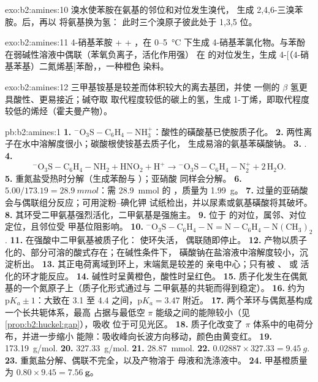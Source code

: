 \begin{solution}{exo:b2:amines:10}
溴水使苯胺在氨基的邻位和对位发生溴代，
生成 2,4,6-三溴苯胺。后，再以  将氨基换为氢：
此时三个溴原子彼此处于 1,3,5 位。
\end{solution}

\begin{solution}{exo:b2:amines:11}
4-硝基苯胺 +  + ，在 0--\qty{5}{\degreeCelsius} 下生成
4-硝基苯氯化物。与苯酚在弱碱性溶液中偶联（苯氧负离子，活化作用强）
在  的对位发生，生成 4-[（4-硝基苯基）二氮烯基]苯酚，，一种橙色
染料。
\end{solution}

\begin{solution}{exo:b2:amines:12}
三甲基铵基是较差而体积较大的离去基团，并使
 一侧的 $\beta$ 氢更具酸性、更易接近；碱夺取
取代程度较低的碳上的氢，生成 1-丁烯，即取代程度较低的烯烃（霍夫曼产物）。
\end{solution}

\begin{solution}{pb:b2:amines:1}
\textbf{1.} $\mathrm{{}^-O_3S{-}C_6H_4{-}NH_3^+}$：酸性的磺酸基已使胺质子化。
\textbf{2.} 两性离子在水中溶解度很小；碳酸根使铵基去质子化，
生成易溶的氨基苯磺酸钠。
\textbf{3.} .
\textbf{4.}
\[
  \mathrm{{}^-O_3S{-}C_6H_4{-}NH_2 + HNO_2 + H^+ \to {}^-O_3S{-}C_6H_4{-}N_2^+ + 2\,H_2O} .
\]
\textbf{5.} 重氮盐受热时分解（生成苯酚与 ）；亚硝酸
同样会分解。
\textbf{6.} $5.00/173.19 = \qty{28.9}{mmol}$：需 \qty{28.9}{mmol} 的 ，质量为 \qty{1.99}{g}。
\textbf{7.} 过量的亚硝酸会与偶联组分反应；可用淀粉–碘化钾
试纸检出，并以尿素或氨基磺酸将其破坏。
\textbf{8.} 其环受二甲氨基强烈活化，二甲氨基是强施主。
\textbf{9.} 位于  的对位，属邻、对位定位，且邻位受
甲基位阻影响。
\textbf{10.} $\mathrm{{}^-O_3S{-}C_6H_4{-}N{=}N{-}C_6H_4{-}N(CH_3)_2}$.
\textbf{11.} 在强酸中二甲氨基被质子化： 使环失活，
偶联随即停止。
\textbf{12.} 产物以质子化的、部分可溶的酸式存在；在碱性条件下，
磺酸钠在盐溶液中溶解度较小，沉淀析出。
\textbf{13.} 其正电荷离域到环上，末端氮是较差的
亲电中心；只有被 、 或  活化的环才能反应。
\textbf{14.} 碱性时呈黄橙色，酸性时呈红色。
\textbf{15.} 质子化发生在偶氮基的一个氮原子上（质子化形式通过与
二甲氨基的共轭而得到稳定）。
\textbf{16.} 约为 $\mathrm pK_a \pm 1$：大致在 3.1 至 4.4 之间，$\mathrm pK_a = 3.47$ 附近。
\textbf{17.} 两个苯环与偶氮基构成一个长共轭体系，最高
占据与最低空 $\pi$ 能级之间的能隙较小（见\cref{prop:b2:huckel:gap}），吸收
位于可见光区。
\textbf{18.} 质子化改变了 $\pi$ 体系中的电荷分布，并进一步缩小
能隙：吸收峰向长波方向移动，颜色由黄变红。
\textbf{19.} \qty{173.19}{g/mol}.
\textbf{20.} \qty{327.33}{g/mol}.
\textbf{21.} \qty{28.87}{mmol}.
\textbf{22.} $0.02887 \times 327.33 = \qty{9.45}{g}$.
\textbf{23.} 重氮盐分解、偶联不完全，以及产物溶于
母液和洗涤液中。
\textbf{24.} 甲基橙质量为 $0.80 \times 9.45 = \boldsymbol{\qty{7.56}{g}}$。
\end{solution}
